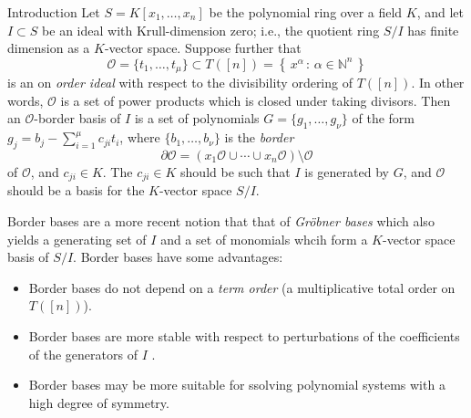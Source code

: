 \documentclass[reqno,a4paper,10pt]{amsart}
\theoremstyle{definition}
\theoremstyle{remark}
\theoremstyle{plain}
\newcommand\setsuchas[2]{\left\{\,{#1}\,:\,{#2}\,\right\}}
\newcommand{\Nat}{{\mathbb{N}}}
\begin{document}
\begin{section}{Introduction}
  Let \(S=K[x_{1},\dots,x_{n}]\) be the polynomial ring over a field \(K\), and let
  \(I \subset S\) be an ideal with Krull-dimension zero; i.e., the quotient ring \(S/I\)
  has finite dimension as a \(K\)-vector space. Suppose further that
  \[\mathcal{O}= \{t_{1},\dots, t_{\mu}\} \subset T([n]) = \setsuchas{x^\alpha}{\alpha \in   \Nat^n}\]
  is an on \emph{order ideal} with
  respect to the divisibility ordering of \(T([n])\). In other words,
  \(\mathcal{O}\) is a set of power products which is closed under taking divisors.
  Then an \(\mathcal{O}\)-border basis
  \cite{KehKreu:CBB,
    kehrein2005algebraist,
    kehrein2006computing,
    kreuzer2008deformations,
    kreuzer2011geometry,
    mourrain2007pythagore,
    mourrain2012border}
  of \(I\) is a set of polynomials \(G=\{g_{1},\dots,g_{\nu}\}\) of the form
  \(g_{j} = b_{j} - \sum_{i=1}^{\mu}c_{ji}t_{i}\), where \(\{b_{1},\dots,b_{\nu}\}\) is the
  \emph{border}
  \[
    \partial \mathcal{O} = (x_{1} \mathcal{O} \cup \cdots \cup x_{n} \mathcal{O}) \setminus \mathcal{O}
  \]
  of \(\mathcal{O}\), and \(c_{ji} \in K\). The \(c_{ji} \in K\) should be such that \(I\) is generated by
  \(G\), and \(\mathcal{O}\) should be a basis for the \(K\)-vector space \(S/I\).

  Border bases are a more recent notion that that of \emph{Gröbner bases}
  \cite{buchberger2006bruno,buchberger1998grobner,froberg1997introduction}
  which also yields a generating set of \(I\) and a set of monomials whcih form
  a \(K\)-vector space basis of \(S/I\).
  Border bases have some advantages:
  \begin{itemize}
    \item Border bases do not depend on a \emph{term order} (a multiplicative total order on \(T([n])\)).
    \item Border bases are more stable with respect to perturbations of the coefficients of the generators of
          \(I\) \cite{abbott2008stable}.
    \item Border bases may be more suitable for ssolving polynomial systems with a high degree of symmetry.
  \end{itemize}


\end{section}
\end{document}
